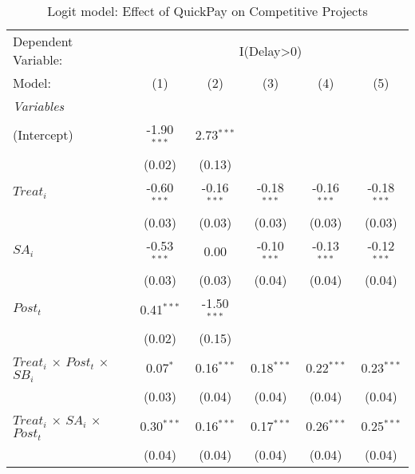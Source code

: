 \documentclass[
]{article}
\begin{document}
\begin{table}[htbp]
   \centering
   \caption{Logit model: Effect of QuickPay on Competitive Projects}
   \begin{tabular}{lccccc}
      \tabularnewline\midrule\midrule
      Dependent Variable: & \multicolumn{5}{c}{I(Delay>0)}\\
      Model:                                        & (1)           & (2)           & (3)           & (4)           & (5)\\
      \midrule \emph{Variables} &   &   &   &   &  \\
      (Intercept)                                   & -1.90$^{***}$ & 2.73$^{***}$  &               &               &   \\
                                                    & (0.02)        & (0.13)        &               &               &   \\
      $Treat_i$                                     & -0.60$^{***}$ & -0.16$^{***}$ & -0.18$^{***}$ & -0.16$^{***}$ & -0.18$^{***}$\\
                                                    & (0.03)        & (0.03)        & (0.03)        & (0.03)        & (0.03)\\
      $SA_i$                                        & -0.53$^{***}$ & 0.00          & -0.10$^{***}$ & -0.13$^{***}$ & -0.12$^{***}$\\
                                                    & (0.03)        & (0.03)        & (0.04)        & (0.04)        & (0.04)\\
      $Post_t$                                      & 0.41$^{***}$  & -1.50$^{***}$ &               &               &   \\
                                                    & (0.02)        & (0.15)        &               &               &   \\
      $Treat_i$ $\times$ $Post_t$ $\times$ $SB_i$ & 0.07$^{*}$    & 0.16$^{***}$  & 0.18$^{***}$  & 0.22$^{***}$  & 0.23$^{***}$\\
                                                    & (0.03)        & (0.04)        & (0.04)        & (0.04)        & (0.04)\\
      $Treat_i$ $\times$ $SA_i$ $\times$ $Post_t$ & 0.30$^{***}$  & 0.16$^{***}$  & 0.17$^{***}$  & 0.26$^{***}$  & 0.25$^{***}$\\
                                                    & (0.04)        & (0.04)        & (0.04)        & (0.04)        & (0.04)\\

\end{tabular}
\end{table}
\end{document}
